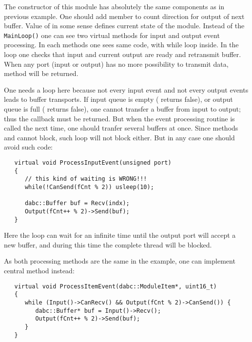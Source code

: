 The constructor of this module has absolutely the same components as in previous example.
One should add  member to count direction for output of next buffer.
Value of  in some sense defines current state of the module. 
Instead of the {\tt MainLoop()} one can see two virtual methods for input and output event
processing. In each methods one sees same code, with while loop inside.
In the loop one checks that input and current output are ready and retransmit buffer.
When any port (input or output) has no more possibility to transmit data, 
method will be returned. 

One needs a  loop here because not every input event and not every output events leads to buffer transports. 
If input queue is empty ( returns false), 
or output queue is full ( returns false), 
one cannot transfer a buffer from input to output; 
thus the callback must be returned. 
But when the event processing routine is called the next time, 
one should tranfer several buffers at once. 
Since methods  and   
cannot block, such  loop will not block either. 
But in any case one should  avoid such  code:

\begin{small}
\begin{verbatim}
   virtual void ProcessInputEvent(unsigned port) 
   {
      // this kind of waiting is WRONG!!!
      while(!CanSend(fCnt % 2)) usleep(10);
   
      dabc::Buffer buf = Recv(indx);
      Output(fCnt++ % 2)->Send(buf);
   }

\end{verbatim}
\end{small}

Here the  loop can wait for an infinite time 
until the output port will accept a new buffer,
and during this time the complete thread will be blocked. 

As both processing methods are the same in the example,  
one can implement central  method instead:  
 
\begin{small}
\begin{verbatim}
   virtual void ProcessItemEvent(dabc::ModuleItem*, uint16_t)
   {
      while (Input()->CanRecv() && Output(fCnt % 2)->CanSend()) {
         dabc::Buffer* buf = Input()->Recv();
         Output(fCnt++ % 2)->Send(buf);
      }
   }
\end{verbatim}
\end{small}

